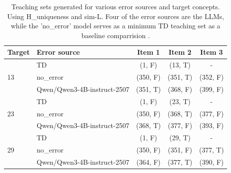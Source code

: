 \begin{table}[h]
\centering
\begin{tabular}{llccc}
\toprule
Target & Error source & Item 1 & Item 2 & Item 3 \\
\midrule
\multirow{3}{*}{13} & TD & (1, F) & (13, T) & - \\
 & no\_error & (350, F) & (351, T) & (352, F) \\
 & Qwen/\allowbreak Qwen3-4B-instruct-2507 & (351, T) & (368, F) & (399, F) \\
\midrule
\multirow{3}{*}{23} & TD & (1, F) & (23, T) & - \\
 & no\_error & (350, F) & (368, T) & (377, F) \\
 & Qwen/\allowbreak Qwen3-4B-instruct-2507 & (368, T) & (377, F) & (393, F) \\
\midrule
\multirow{3}{*}{29} & TD & (1, F) & (29, T) & - \\
 & no\_error & (350, F) & (351, F) & (377, T) \\
 & Qwen/\allowbreak Qwen3-4B-instruct-2507 & (364, F) & (377, T) & (390, F) \\
\midrule
\bottomrule
\end{tabular}
\caption{Teaching sets generated for various error sources and target concepts. Using H\_uniqueness and sim-L. Four of the error sources are the LLMs, while the 'no\_error' model serves as a minimum TD teaching set as a baseline comparrision .}
\end{table}